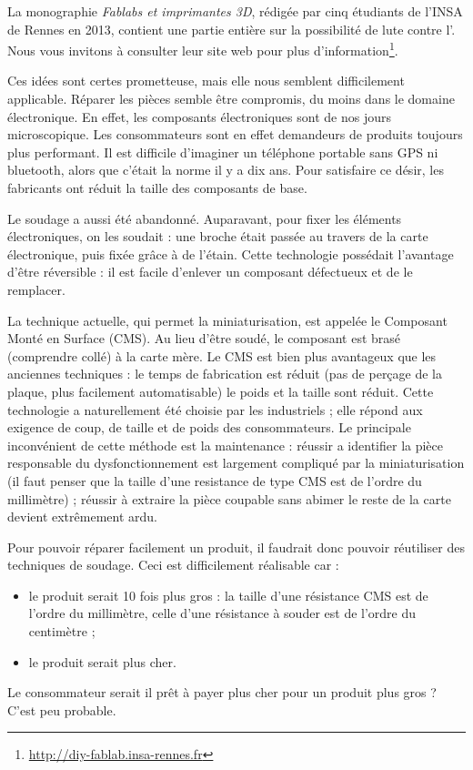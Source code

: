 La monographie \textit{Fablabs et imprimantes 3D}, rédigée par cinq étudiants de l'INSA de Rennes en 2013, contient une partie entière sur la possibilité de lute contre l'\op. Nous vous invitons à consulter leur site web pour plus d'information\footnote{\url{http://diy-fablab.insa-rennes.fr}}.


\bigbreak 

Ces idées sont certes prometteuse, mais elle nous semblent difficilement applicable. Réparer les pièces semble  être compromis, du moins dans le domaine électronique. En effet, les composants électroniques sont de nos jours microscopique. Les consommateurs sont en effet demandeurs de produits toujours plus performant. Il est difficile d'imaginer un téléphone portable sans GPS ni bluetooth, alors que c'était la norme il y a dix ans. Pour satisfaire ce désir, les fabricants ont réduit la taille des composants de base. 

Le soudage a aussi été abandonné. Auparavant, pour fixer les éléments électroniques, on les soudait : une broche était passée au travers de la carte électronique, puis fixée grâce à de l'étain. Cette technologie possédait l'avantage d'être réversible : il est facile d'enlever un composant défectueux et de le remplacer. 

La technique actuelle, qui permet la miniaturisation, est appelée le Composant Monté en Surface (CMS). Au lieu d'être soudé, le composant est brasé (comprendre collé) à la carte mère. Le CMS est bien plus avantageux que les anciennes techniques : le temps de fabrication est réduit (pas de perçage de la plaque, plus facilement automatisable) le poids et la taille  sont réduit. Cette technologie a naturellement été choisie par les industriels ; elle répond aux exigence de coup, de taille et de poids des consommateurs. Le principale inconvénient de cette méthode est la maintenance : réussir a identifier la pièce responsable du dysfonctionnement est largement compliqué par la miniaturisation (il faut penser que la taille d'une resistance de type CMS est de  l'ordre du millimètre) ; réussir à extraire la pièce coupable sans abimer le reste de la carte devient extrêmement ardu. 

Pour pouvoir  réparer facilement un produit, il faudrait donc pouvoir réutiliser des techniques de soudage. Ceci est difficilement réalisable car : 
\begin{itemize}
\item le produit serait 10 fois plus gros : la taille d'une résistance CMS est de l'ordre du millimètre, celle d'une résistance à souder est de l'ordre du centimètre ;
\item le produit serait plus cher. 
\end{itemize}
Le consommateur serait il prêt à payer plus cher pour un produit plus gros ? C'est peu probable.

